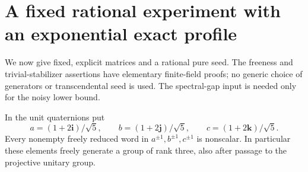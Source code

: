 \section{A fixed rational experiment with an exponential exact profile}
\label{sec:rationalendpoint58}
We now give fixed, explicit matrices and a rational pure seed. The
freeness and trivial-stabilizer assertions have elementary finite-field
proofs; no generic choice of generators or transcendental seed is used.
The spectral-gap input is needed only for the noisy lower bound.

\begin{lemma}\label{lem:freequaternion58}
In the unit quaternions put
\[
 a=(1+2\mathbf i)/\sqrt5,\qquad
 b=(1+2\mathbf j)/\sqrt5,\qquad
 c=(1+2\mathbf k)/\sqrt5.
\]
Every nonempty freely reduced word in $a^{\pm1},b^{\pm1},c^{\pm1}$ is
nonscalar. In particular these elements freely generate a group of rank
three, also after passage to the projective unitary group.
\end{lemma}
